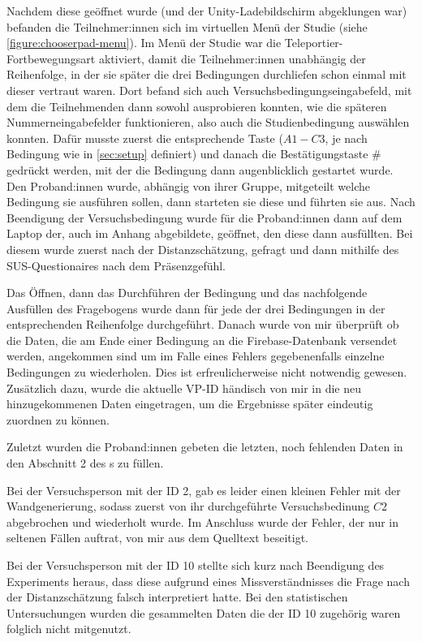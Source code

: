         Nachdem diese geöffnet wurde (und der Unity-Ladebildschirm abgeklungen war) befanden die Teilnehmer:innen sich im virtuellen Menü der Studie (siehe \autoref{figure:chooserpad-menu}). Im Menü der Studie war die Teleportier-Fortbewegungsart aktiviert, damit die Teilnehmer:innen unabhängig der Reihenfolge, in der sie später die drei Bedingungen durchliefen schon einmal mit dieser vertraut waren.
        Dort befand sich auch Versuchsbedingungseingabefeld, mit dem die Teilnehmenden dann sowohl ausprobieren konnten, wie die späteren Nummerneingabefelder funktionieren, also auch die Studienbedingung auswählen konnten. Dafür musste zuerst die entsprechende Taste ($A1-C3$, je nach Bedingung wie in \autoref{sec:setup} definiert) und danach die Bestätigungstaste \# gedrückt werden, mit der die Bedingung dann augenblicklich gestartet wurde. Den Proband:innen wurde, abhängig von ihrer Gruppe, mitgeteilt welche Bedingung sie ausführen sollen, dann starteten sie diese und führten sie aus.
        Nach Beendigung der Versuchsbedingung wurde für die Proband:innen dann auf dem Laptop der, auch im Anhang abgebildete, 
        geöffnet, den diese dann ausfüllten. Bei diesem wurde zuerst nach der Distanzschätzung, gefragt und dann mithilfe des SUS-Questionaires
        nach dem Präsenzgefühl.

        Das Öffnen, dann das Durchführen der Bedingung und das nachfolgende Ausfüllen des Fragebogens %
        wurde dann für jede der drei Bedingungen in der entsprechenden Reihenfolge durchgeführt. Danach wurde von mir überprüft ob die Daten, die am Ende einer Bedingung an die Firebase-Datenbank versendet werden, angekommen sind um im Falle eines Fehlers gegebenenfalls einzelne Bedingungen zu wiederholen. Dies ist erfreulicherweise nicht notwendig gewesen. Zusätzlich dazu, wurde die aktuelle VP-ID händisch von mir in die neu hinzugekommenen Daten eingetragen, um die Ergebnisse später eindeutig zuordnen zu können.

        Zuletzt wurden die Proband:innen gebeten die letzten, noch fehlenden Daten in den Abschnitt 2 des s zu füllen.

        Bei der Versuchsperson mit der ID 2, gab es leider einen kleinen Fehler mit der Wandgenerierung, sodass zuerst von ihr durchgeführte Versuchsbedinung $C2$ abgebrochen und wiederholt wurde. Im Anschluss wurde der Fehler, der nur in seltenen Fällen auftrat, von mir aus dem Quelltext beseitigt.

        Bei der Versuchsperson mit der ID 10 stellte sich kurz nach Beendigung des Experiments heraus, dass diese aufgrund eines Missverständnisses die Frage nach der Distanzschätzung falsch interpretiert hatte. Bei den statistischen Untersuchungen wurden die gesammelten Daten die der ID 10 zugehörig waren folglich nicht mitgenutzt.

